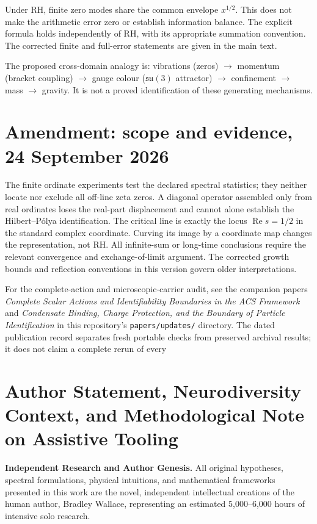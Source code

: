 \documentclass[11pt,a4paper]{article}
\theoremstyle{plain}
\theoremstyle{definition}
\theoremstyle{remark}
\begin{document}
Under RH, finite zero modes share the common envelope $x^{1/2}$.
This does not make the arithmetic error zero or establish information
balance. The explicit formula holds independently of RH, with its
appropriate summation convention. The corrected finite and full-error
statements are given in the main text.

The proposed cross-domain analogy is: vibrations (zeros) $\to$ momentum
(bracket coupling) $\to$ gauge colour ($\mathfrak{su}(3)$ attractor)
$\to$ confinement $\to$ mass $\to$ gravity. It is not a proved identification
of these generating mechanisms.


\section*{Amendment: scope and evidence, 24 September 2026}
The finite ordinate experiments test the declared spectral statistics; they neither locate nor exclude all off-line zeta zeros. A diagonal operator assembled only from real ordinates loses the real-part displacement and cannot alone establish the Hilbert--P\'olya identification. The critical line is exactly the locus $\operatorname{Re}s=1/2$ in the standard complex coordinate. Curving its image by a coordinate map changes the representation, not RH. All infinite-sum or long-time conclusions require the relevant convergence and exchange-of-limit argument. The corrected growth bounds and reflection conventions in this version govern older interpretations.

For the complete-action and microscopic-carrier audit, see the companion
papers \emph{Complete Scalar Actions and Identifiability Boundaries in the ACS
Framework} and \emph{Condensate Binding, Charge Protection, and the Boundary
of Particle Identification} in this repository's \texttt{papers/updates/}
directory. The dated publication record separates fresh portable checks
from preserved archival results; it does not claim a complete rerun of every
\section*{Author Statement, Neurodiversity Context, and Methodological Note on Assistive Tooling}
\noindent\textbf{Independent Research and Author Genesis.} 
All original hypotheses, spectral formulations, physical intuitions, and mathematical frameworks presented in this work are the novel, independent intellectual creations of the human author, Bradley Wallace, representing an estimated 5,000--6,000 hours of intensive solo research.
\end{document}
